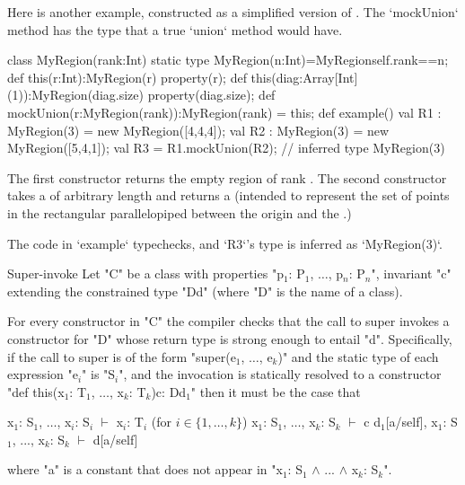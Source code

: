 \begin{example}
Here is another example, constructed as a simplified 
version of .  The \xcd`mockUnion` method 
has the type that a true \xcd`union` method would have.

\begin{xten}
class MyRegion(rank:Int) {
  static type MyRegion(n:Int)=MyRegion{self.rank==n};
  def this(r:Int):MyRegion(r) {
    property(r);
  }
  def this(diag:Array[Int](1)):MyRegion(diag.size){ 
    property(diag.size);
  }
  def mockUnion(r:MyRegion(rank)):MyRegion(rank) = this;
  def example() {
    val R1 : MyRegion(3) = new MyRegion([4,4,4]); 
    val R2 : MyRegion(3) = new MyRegion([5,4,1]); 
    val R3 = R1.mockUnion(R2); // inferred type MyRegion(3)
  }
}
\end{xten}
%
The first constructor returns the empty region of rank .  The
second constructor takes a  of arbitrary length
 and returns a  (intended to represent the set
of points in the rectangular parallelopiped between the origin and the
.)

The code in \xcd`example` typechecks, and \xcd`R3`'s type is inferred as
\xcd`MyRegion(3)`.  


\end{example}

\begin{staticrule}{Super-invoke}
   Let \xcd"C" be a class with properties
   \xcdmath"p$_1$: P$_1$, $\dots$, p$_n$: P$_n$", invariant \xcd"c"
   extending the constrained type \xcd"D{d}" (where \xcd"D" is the name of a class).

   For every constructor in \xcd"C" the compiler checks that the call to
   super invokes a constructor for \xcd"D" whose return type is strong enough
   to entail \xcd"d". Specifically, if the call to super is of the form 
     \xcdmath"super(e$_1$, $\dots$, e$_k$)"
   and the static type of each expression \xcdmath"e$_i$" is
   \xcdmath"S$_i$", and the invocation
   is statically resolved to a constructor
\xcdmath"def this(x$_1$: T$_1$, $\dots$, x$_k$: T$_k$){c}: D{d$_1$}"
   then it must be the case that 
\begin{xtenmath}
x$_1$: S$_1$, $\dots$, x$_i$: S$_i$ $\vdash$ x$_i$: T$_i$  (for $i \in \{1, \dots, k\}$)
x$_1$: S$_1$, $\dots$, x$_k$: S$_k$ $\vdash$ c  
d$_1$[a/self], x$_1$: S$_1$, ..., x$_k$: S$_k$ $\vdash$ d[a/self]      
\end{xtenmath}
\noindent where \xcd"a" is a constant that does not appear in 
\xcdmath"x$_1$: S$_1$ $\wedge$ ... $\wedge$ x$_k$: S$_k$".
\end{staticrule}

